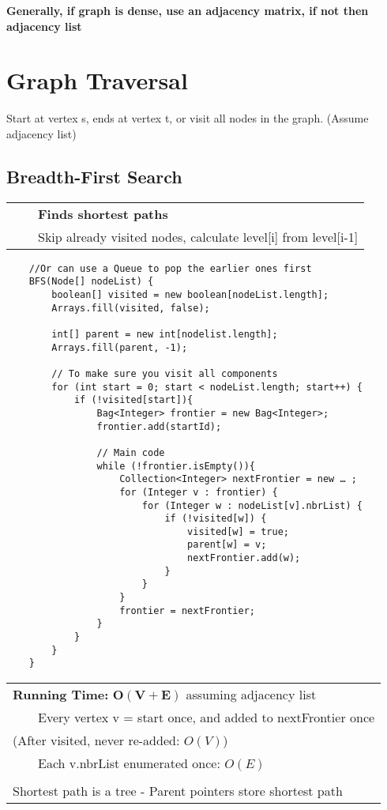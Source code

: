 \documentclass{article}
\newcommand{\tabitem}{~~\llap{\textbullet}~~}
\begin{document}
    \noindent\textbf{Generally, if graph is dense, use an adjacency matrix, if not then adjacency list}

    \pagebreak
    
    \section{Graph Traversal}

    Start at vertex s, ends at vertex t, or visit all nodes in the graph. (Assume adjacency list)
    

    \subsection{Breadth-First Search}

    \begin{tabular}{l}
        \tabitem \textbf{Finds shortest paths}\\
        \tabitem Skip already visited nodes, calculate level[i] from level[i-1]\\
    \end{tabular}

    \begin{verbatim}
    //Or can use a Queue to pop the earlier ones first
    BFS(Node[] nodeList) {
        boolean[] visited = new boolean[nodeList.length];
        Arrays.fill(visited, false);

        int[] parent = new int[nodelist.length];
        Arrays.fill(parent, -1);

        // To make sure you visit all components 
        for (int start = 0; start < nodeList.length; start++) {
            if (!visited[start]){
                Bag<Integer> frontier = new Bag<Integer>;
                frontier.add(startId);

                // Main code
                while (!frontier.isEmpty()){
                    Collection<Integer> nextFrontier = new … ;
                    for (Integer v : frontier) {
                        for (Integer w : nodeList[v].nbrList) {
                            if (!visited[w]) {
                                visited[w] = true;
                                parent[w] = v;
                                nextFrontier.add(w);
                            }
                        }
                    }
                    frontier = nextFrontier;
                }
            }
        }
    }
    \end{verbatim}

    \begin{tabular}{l}
        \textbf{Running Time:} $\bm{O(V + E)}$ assuming adjacency list\\
        \tabitem Every vertex v = start once, and added to nextFrontier once \\
        (After visited, never re-added: $O(V)$)\\
        \tabitem Each v.nbrList enumerated once: $O(E)$\\\\
        Shortest path is a tree - Parent pointers store shortest path   
    \end{tabular}
\end{document}
